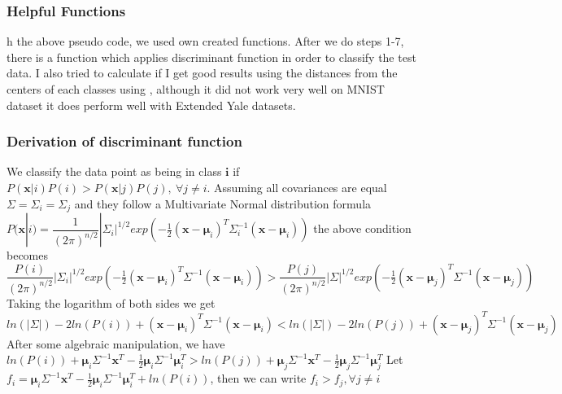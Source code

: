 \subsubsection{Helpful Functions}

h the above pseudo code, we used own created functions. After we do steps 1-7, there is a function  which applies discriminant function in order to classify the test data. I also tried to calculate if I get good results using the distances from the centers of each classes using , although it did not work very well on MNIST dataset it does perform well with Extended Yale datasets.

\subsubsection{Derivation of discriminant function}

We classify the data point as being in class $\pmb i$ if
$P(\pmb x|i) P(i) > P(\pmb x|j) P(j),\ \forall j\neq i$. 
Assuming all covariances are equal $\Sigma = \Sigma_i = \Sigma_j$ and they follow a Multivariate Normal distribution formula $P(\pmb x| i) = \dfrac{1}{(2 \pi)^{n/2}} |\Sigma_i|^{1/2} exp(-\frac{1}{2} (\pmb x - \pmb \mu_i)^T \Sigma_i^{-1} (\pmb x - \pmb \mu_i) ) $ the above condition becomes
$\dfrac{P(i)}{(2 \pi)^{n/2}} |\Sigma_i|^{1/2} exp(-\frac{1}{2} (\pmb x - \pmb \mu_i)^T \Sigma^{-1} (\pmb x - \pmb \mu_i) ) > \dfrac{P(j)}{(2 \pi)^{n/2}} |\Sigma|^{1/2} exp(-\frac{1}{2} (\pmb x - \pmb \mu_j)^T \Sigma^{-1} (\pmb x - \pmb \mu_j) ) $
		Taking the logarithm of both sides we get 
		$ln(|\Sigma|) - 2 ln(P(i)) + (\pmb x - \pmb \mu_i)^T \Sigma^{-1} (\pmb x - \pmb \mu_i) < ln(|\Sigma|) - 2 ln(P(j)) + (\pmb x - \pmb \mu_j)^T \Sigma^{-1} (\pmb x - \pmb \mu_j)$
		After some algebraic manipulation, we have 
		$ ln(P(i)) + \pmb \mu_i \Sigma^{-1} \pmb x^T - \frac{1}{2} \pmb \mu_i \Sigma^{-1} \pmb \mu_i^T > ln(P(j)) + \pmb \mu_j \Sigma^{-1} \pmb x^T - \frac{1}{2} \pmb \mu_j \Sigma^{-1} \pmb \mu_j^T $
		Let $f_i =  \pmb \mu_i \Sigma^{-1} \pmb x^T - \frac{1}{2} \pmb \mu_i \Sigma^{-1} \pmb \mu_i^T + ln(P(i))$, then we can write 
		$ f_i > f_j, \forall j\neq i $
